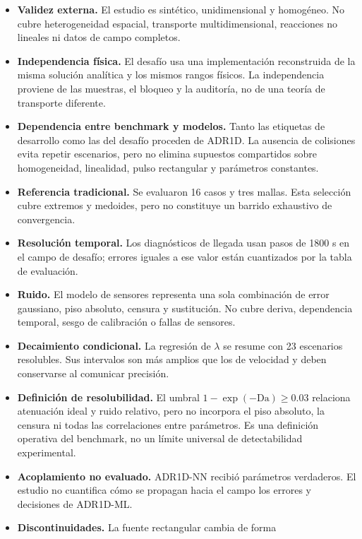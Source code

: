 \documentclass[11pt,a4paper]{article}
\begin{document}
\begin{itemize}
    \item \textbf{Validez externa.} El estudio es sintético, unidimensional y
    homogéneo. No cubre heterogeneidad espacial, transporte multidimensional,
    reacciones no lineales ni datos de campo completos.
    \item \textbf{Independencia física.} El desafío usa una implementación
    reconstruida de la misma solución analítica y los mismos rangos físicos.
    La independencia proviene de las muestras, el bloqueo y la auditoría, no de
    una teoría de transporte diferente.
    \item \textbf{Dependencia entre benchmark y modelos.} Tanto las etiquetas
    de desarrollo como las del desafío proceden de ADR1D. La ausencia de
    colisiones evita repetir escenarios, pero no elimina supuestos compartidos
    sobre homogeneidad, linealidad, pulso rectangular y parámetros constantes.
    \item \textbf{Referencia tradicional.} Se evaluaron 16 casos y tres mallas.
    Esta selección cubre extremos y medoides, pero no constituye un barrido
    exhaustivo de convergencia.
    \item \textbf{Resolución temporal.} Los diagnósticos de llegada usan pasos
    de 1800 s en el campo de desafío; errores iguales a ese valor están
    cuantizados por la tabla de evaluación.
    \item \textbf{Ruido.} El modelo de sensores representa una sola combinación
    de error gaussiano, piso absoluto, censura y sustitución. No cubre deriva,
    dependencia temporal, sesgo de calibración o fallas de sensores.
    \item \textbf{Decaimiento condicional.} La regresión de $\lambda$ se resume
    con 23 escenarios resolubles. Sus intervalos son más amplios que los de
    velocidad y deben conservarse al comunicar precisión.
    \item \textbf{Definición de resolubilidad.} El umbral
    $1-\exp(-\mathrm{Da})\geq0.03$ relaciona atenuación ideal y ruido relativo,
    pero no incorpora el piso absoluto, la censura ni todas las correlaciones
    entre parámetros. Es una definición operativa del benchmark, no un límite
    universal de detectabilidad experimental.
    \item \textbf{Acoplamiento no evaluado.} ADR1D-NN recibió parámetros
    verdaderos. El estudio no cuantifica cómo se propagan hacia el campo los
    errores y decisiones de ADR1D-ML.
    \item \textbf{Discontinuidades.} La fuente rectangular cambia de forma

\end{itemize}
\end{document}
